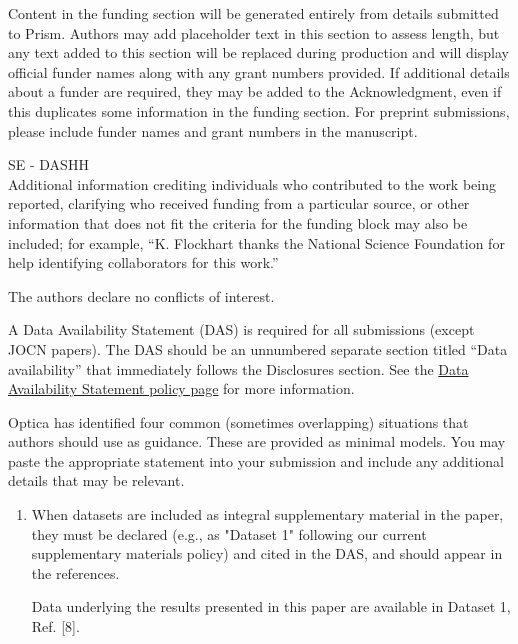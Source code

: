 \documentclass{optica-article}
\begin{document}
\begin{backmatter}
Content in the funding section will be generated entirely from details submitted to Prism. Authors may add placeholder text in this section to assess length, but any text added to this section will be replaced during production and will display official funder names along with any grant numbers provided. If additional details about a funder are required, they may be added to the Acknowledgment, even if this duplicates some information in the funding section. For preprint submissions, please include funder names and grant numbers in the manuscript.

SE - DASHH \\
Additional information crediting individuals who contributed to the work being reported, clarifying who received funding from a particular source, or other information that does not fit the criteria for the funding block may also be included; for example, ``K. Flockhart thanks the National Science Foundation for help identifying collaborators for this work.'' 

The authors declare no conflicts of interest.


A Data Availability Statement (DAS) is required for all submissions (except JOCN papers). The DAS should be an unnumbered separate section titled ``Data availability'' that
immediately follows the Disclosures section. See the \href{https://opg.optica.org/submit/review/data-availability-policy.cfm}{Data Availability Statement policy page} for more information.

Optica has identified four common (sometimes overlapping) situations that authors should use as guidance. These are provided as minimal models. You may paste the appropriate statement into your submission and include any additional details that may be relevant.

\begin{enumerate}
\item When datasets are included as integral supplementary material in the paper, they must be declared (e.g., as "Dataset 1" following our current supplementary materials policy) and cited in the DAS, and should appear in the references.

 Data underlying the results presented in this paper are available in Dataset 1, Ref. [8].

\bigskip


\end{enumerate}
\end{backmatter}
\end{document}
